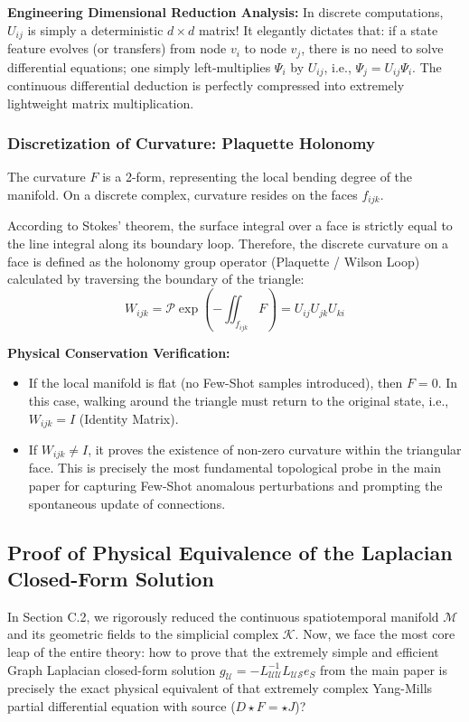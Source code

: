 \documentclass{article}
\begin{document}
\noindent\textbf{Engineering Dimensional Reduction Analysis:} In discrete computations, $U_{ij}$ is simply a deterministic $d \times d$ matrix! It elegantly dictates that: if a state feature evolves (or transfers) from node $v_i$ to node $v_j$, there is no need to solve differential equations; one simply left-multiplies $\Psi_i$ by $U_{ij}$, i.e., $\Psi_j = U_{ij} \Psi_i$. The continuous differential deduction is perfectly compressed into extremely lightweight matrix multiplication.

\subsubsection{Discretization of Curvature: Plaquette Holonomy}

The curvature $F$ is a 2-form, representing the local bending degree of the manifold. On a discrete complex, curvature resides on the faces $f_{ijk}$.

According to Stokes' theorem, the surface integral over a face is strictly equal to the line integral along its boundary loop. Therefore, the discrete curvature on a face is defined as the holonomy group operator (Plaquette / Wilson Loop) calculated by traversing the boundary of the triangle:
\begin{equation}
W_{ijk} = \mathcal{P}\exp \left( -\iint_{f_{ijk}} F \right) = U_{ij} U_{jk} U_{ki}
\end{equation}

\noindent\textbf{Physical Conservation Verification:}
\begin{itemize}
    \item If the local manifold is flat (no Few-Shot samples introduced), then $F=0$. In this case, walking around the triangle must return to the original state, i.e., $W_{ijk} = I$ (Identity Matrix).
    \item If $W_{ijk} \neq I$, it proves the existence of non-zero curvature within the triangular face. This is precisely the most fundamental topological probe in the main paper for capturing Few-Shot anomalous perturbations and prompting the spontaneous update of connections.
\end{itemize}
\subsection{Proof of Physical Equivalence of the Laplacian Closed-Form Solution}

In Section C.2, we rigorously reduced the continuous spatiotemporal manifold $\mathcal{M}$ and its geometric fields to the simplicial complex $\mathcal{K}$. Now, we face the most core leap of the entire theory: how to prove that the extremely simple and efficient Graph Laplacian closed-form solution $g_{\mathcal{U}} = -L_{\mathcal{UU}}^{-1}L_{\mathcal{US}}e_S$ from the main paper is precisely the exact physical equivalent of that extremely complex Yang-Mills partial differential equation with source ($D \star F = \star J$)?
\end{document}
